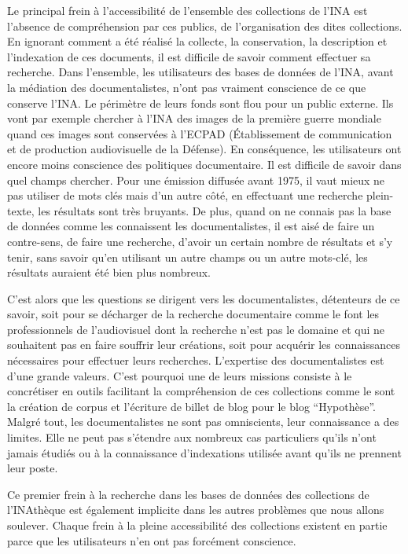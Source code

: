 
Le principal frein à l'accessibilité de l'ensemble des collections de l'INA est l'absence de compréhension par ces publics, de l'organisation des dites collections. En ignorant comment a été réalisé la collecte, la conservation, la description et l'indexation de ces documents, il est difficile de savoir comment effectuer sa recherche. Dans l'ensemble, les utilisateurs des bases de données de l'INA, avant la médiation des documentalistes, n'ont pas vraiment conscience de ce que conserve l'INA. Le périmètre de leurs fonds sont flou pour un public externe. Ils vont par exemple chercher à l'INA des images de la première guerre mondiale quand ces images sont conservées à l'ECPAD (Établissement de communication et de production audiovisuelle de la Défense). En conséquence, les utilisateurs ont encore moins conscience des politiques documentaire. Il est difficile de savoir dans quel champs chercher. Pour une émission diffusée avant 1975, il vaut mieux ne pas utiliser de mots clés mais d'un autre côté, en effectuant une recherche plein-texte, les résultats sont très bruyants. De plus, quand on ne connais pas la base de données comme les connaissent les documentalistes, il est aisé de faire un contre-sens, de faire une recherche, d'avoir un certain nombre de résultats et s'y tenir, sans savoir qu'en utilisant un autre champs ou un autre mots-clé, les résultats auraient été bien plus nombreux. 


C'est alors que les questions se dirigent vers les documentalistes, détenteurs de ce savoir, soit pour se décharger de la recherche documentaire comme le font les professionnels de l’audiovisuel dont la recherche n'est pas le domaine et qui ne souhaitent pas en faire souffrir leur créations, soit pour acquérir les connaissances nécessaires pour effectuer leurs recherches. L'expertise des documentalistes est d'une grande valeurs. C'est pourquoi une de leurs missions consiste à le concrétiser en outils facilitant la compréhension de ces collections comme le sont la création de corpus et l'écriture de billet de blog pour le blog \enquote{Hypothèse}. Malgré tout, les documentalistes ne sont pas omniscients, leur connaissance a des limites. Elle ne peut pas s'étendre aux nombreux cas particuliers qu'ils n'ont jamais étudiés ou à la connaissance d'indexations utilisée avant qu'ils ne prennent leur poste. 

Ce premier frein à la recherche dans les bases de données des collections de l'INAthèque est également implicite dans les autres problèmes que nous allons soulever. Chaque frein à la pleine accessibilité des collections existent en partie parce que les utilisateurs n'en ont pas forcément conscience. 